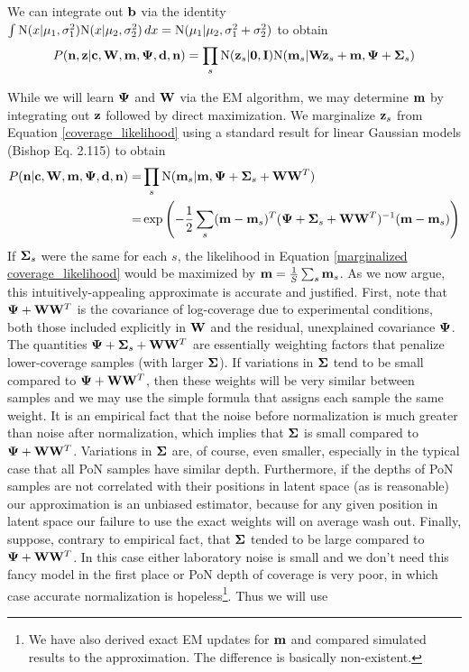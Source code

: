 \documentclass[nofootinbib,amssymb,amsmath]{revtex4}
\newcommand{\vzero}{{\bf 0}}
\newcommand{\vI}{{\bf I}}
\newcommand{\vb}{{\bf b}}
\newcommand{\vd}{{\bf d}}
\newcommand{\vc}{{\bf c}}
\newcommand{\vz}{{\bf z}}
\newcommand{\vn}{{\bf n}}
\newcommand{\vm}{{\bf m}}
\newcommand{\vW}{{\bf W}}
\newcommand{\vPsi}{{\bf \Psi}}
\newcommand{\vSigma}{{\bf \Sigma}}
\begin{document}
We can integrate out $\vb$ via the identity $\int {\rm N}(x | \mu_1, \sigma_1^2) {\rm N}(x | \mu_2, \sigma_2^2) \, dx = {\rm N}(\mu_1 | \mu_2, \sigma_1^2 + \sigma_2^2)$ to obtain
%
\begin{equation}
P(\vn, \vz | \vc, \vW, \vm, \vPsi, \vd, \vn) = \prod_s {\rm N}(\vz_s | \vzero, \vI) {\rm N}(\vm_s | \vW \vz_s + \vm, \vPsi + \vSigma_s)
\label{coverage_likelihood}
\end{equation}
%

While we will learn $\vPsi$ and $\vW$ via the EM algorithm, we may determine $\vm$ by integrating out $\vz$ followed by direct maximization.  We marginalize $\vz_s$ from Equation \ref{coverage_likelihood} using a standard result for linear Gaussian models (Bishop Eq. 2.115) to obtain
%
\begin{align}
P(\vn | \vc, \vW, \vm, \vPsi, \vd, \vn) =& \prod_s {\rm N} (\vm_s | \vm, \vPsi + \vSigma_s + \vW \vW^T) \\
=& \exp \left( -\frac{1}{2} \sum_s (\vm - \vm_s)^T (\vPsi + \vSigma_s + \vW \vW^T)^{-1} (\vm - \vm_s) \right)
\label{marginalized coverage_likelihood}
\end{align}
%
If $\vSigma_s$ were the same for each $s$, the likelihood in Equation \ref{marginalized coverage_likelihood} would be maximized by $\vm = \frac{1}{S} \sum_s \vm_s$.  As we now argue, this intuitively-appealing approximate is accurate and justified.  First, note that $\vPsi + \vW \vW^T$ is  the covariance of log-coverage due to experimental conditions, both those included explicitly in $\vW$ and the residual, unexplained covariance $\vPsi$.  The quantities $\vPsi + \vSigma_s + \vW \vW^T$ are essentially weighting factors that penalize lower-coverage samples (with larger $\vSigma$).  If variations in $\vSigma$ tend to be small compared to $\vPsi + \vW \vW^T$, then these weights will be very similar between samples and we may use the simple formula that assigns each sample the same weight.  It is an empirical fact that the noise before normalization is much greater than noise after normalization, which implies that $\vSigma$ is small compared to $\vPsi + \vW \vW^T$.  Variations in $\vSigma$ are, of course, even smaller, especially in the typical case that all PoN samples have similar depth.  Furthermore, if the depths of PoN samples are not correlated with their positions in latent space (as is reasonable) our approximation is an unbiased estimator, because for any given position in latent space our failure to use the exact weights will on average wash out.  Finally, suppose, contrary to empirical fact, that $\vSigma$ tended to be large compared to $\vPsi + \vW \vW^T$.  In this case either laboratory noise is small and we don't need this fancy model in the first place or PoN depth of coverage is very poor, in which case accurate normalization is hopeless\footnote{We have also derived exact EM updates for $\vm$ and compared simulated results to the approximation.  The difference is basically non-existent.}.  Thus we will use
\end{document}
